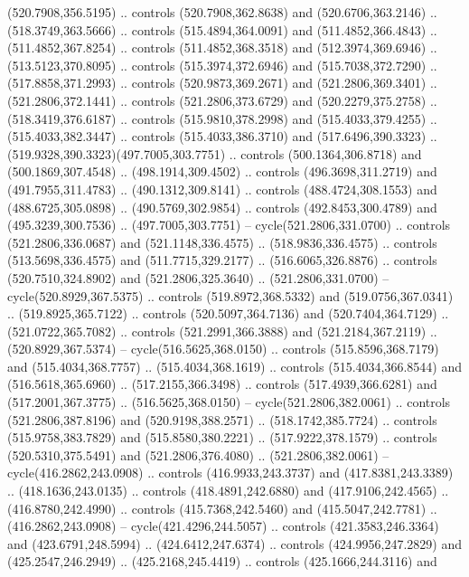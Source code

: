 \begin{scope}[cm={{1.25,0.0,0.0,-1.25,(0.0,743.43331)}}]
    (520.7908,356.5195) .. controls (520.7908,362.8638) and (520.6706,363.2146) ..
    (518.3749,363.5666) .. controls (515.4894,364.0091) and (511.4852,366.4843) ..
    (511.4852,367.8254) .. controls (511.4852,368.3518) and (512.3974,369.6946) ..
    (513.5123,370.8095) .. controls (515.3974,372.6946) and (515.7038,372.7290) ..
    (517.8858,371.2993) .. controls (520.9873,369.2671) and (521.2806,369.3401) ..
    (521.2806,372.1441) .. controls (521.2806,373.6729) and (520.2279,375.2758) ..
    (518.3419,376.6187) .. controls (515.9810,378.2998) and (515.4033,379.4255) ..
    (515.4033,382.3447) .. controls (515.4033,386.3710) and (517.6496,390.3323) ..
    (519.9328,390.3323)(497.7005,303.7751) .. controls (500.1364,306.8718) and
    (500.1869,307.4548) .. (498.1914,309.4502) .. controls (496.3698,311.2719) and
    (491.7955,311.4783) .. (490.1312,309.8141) .. controls (488.4724,308.1553) and
    (488.6725,305.0898) .. (490.5769,302.9854) .. controls (492.8453,300.4789) and
    (495.3239,300.7536) .. (497.7005,303.7751) -- cycle(521.2806,331.0700) ..
    controls (521.2806,336.0687) and (521.1148,336.4575) .. (518.9836,336.4575) ..
    controls (513.5698,336.4575) and (511.7715,329.2177) .. (516.6065,326.8876) ..
    controls (520.7510,324.8902) and (521.2806,325.3640) .. (521.2806,331.0700) --
    cycle(520.8929,367.5375) .. controls (519.8972,368.5332) and
    (519.0756,367.0341) .. (519.8925,365.7122) .. controls (520.5097,364.7136) and
    (520.7404,364.7129) .. (521.0722,365.7082) .. controls (521.2991,366.3888) and
    (521.2184,367.2119) .. (520.8929,367.5374) -- cycle(516.5625,368.0150) ..
    controls (515.8596,368.7179) and (515.4034,368.7757) .. (515.4034,368.1619) ..
    controls (515.4034,366.8544) and (516.5618,365.6960) .. (517.2155,366.3498) ..
    controls (517.4939,366.6281) and (517.2001,367.3775) .. (516.5625,368.0150) --
    cycle(521.2806,382.0061) .. controls (521.2806,387.8196) and
    (520.9198,388.2571) .. (518.1742,385.7724) .. controls (515.9758,383.7829) and
    (515.8580,380.2221) .. (517.9222,378.1579) .. controls (520.5310,375.5491) and
    (521.2806,376.4080) .. (521.2806,382.0061) -- cycle(416.2862,243.0908) ..
    controls (416.9933,243.3737) and (417.8381,243.3389) .. (418.1636,243.0135) ..
    controls (418.4891,242.6880) and (417.9106,242.4565) .. (416.8780,242.4990) ..
    controls (415.7368,242.5460) and (415.5047,242.7781) .. (416.2862,243.0908) --
    cycle(421.4296,244.5057) .. controls (421.3583,246.3364) and
    (423.6791,248.5994) .. (424.6412,247.6374) .. controls (424.9956,247.2829) and
    (425.2547,246.2949) .. (425.2168,245.4419) .. controls (425.1666,244.3116) and

\end{scope}
